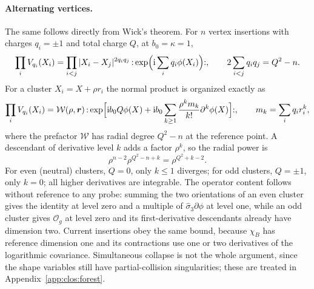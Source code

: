 \documentclass[11pt,a4paper]{article}
\numberwithin{equation}{section}
\newcommand{\Og}{\mathcal O_g}
\begin{document}
\paragraph{Alternating vertices.} The same follows directly from Wick's theorem. For $n$ vertex insertions with charges
$q_i=\pm1$ and total charge $Q$, at $b_0=\kappa=1$,
\begin{equation}
 \prod_iV_{q_i}(X_i)=\prod_{i<j}|X_i-X_j|^{2q_iq_j}\,{:}\exp\Bigl(\mathrm i\sum_iq_i\phi(X_i)\Bigr){:},
 \qquad 2\sum_{i<j}q_iq_j=Q^2-n .
\end{equation}
For a cluster $X_i=X+\rho r_i$ the normal product is organized exactly as
\begin{equation}
 \prod_iV_{q_i}(X_i)=\mathcal W(\rho,\boldsymbol r)\,
 {:}\exp\Bigl[\mathrm i b_0Q\phi(X)+\mathrm i b_0\sum_{k\ge1}\frac{\rho^km_k}{k!}\partial^k\phi(X)\Bigr]{:},\qquad
 m_k=\sum_iq_ir_i^k,
 \label{eq:clos:wick}
\end{equation}
where the prefactor $\mathcal W$ has radial degree $Q^2-n$ at the reference point. A descendant of derivative level $k$
adds a factor $\rho^k$, so the radial power is
\begin{equation}
 \rho^{n-2}\rho^{Q^2-n+k}=\rho^{Q^2+k-2}.
\end{equation}
For even (neutral) clusters, $Q=0$, only $k\le1$ diverges; for odd clusters, $Q=\pm1$, only $k=0$; all higher
derivatives are integrable. The operator content follows without reference to any probe: summing the two orientations
of an even cluster gives the identity at level zero and a multiple of $\hat\sigma_3\partial\phi$ at level one, while an
odd cluster gives $\Og$ at level zero and its first-derivative descendants already have dimension two. Current
insertions obey the same bound, because $\chi_B$ has reference dimension one and its contractions use one or two
derivatives of the logarithmic covariance. Simultaneous collapse is not the whole argument, since the shape variables
still have partial-collision singularities; these are treated in Appendix~\ref{app:clos:forest}.
\end{document}
